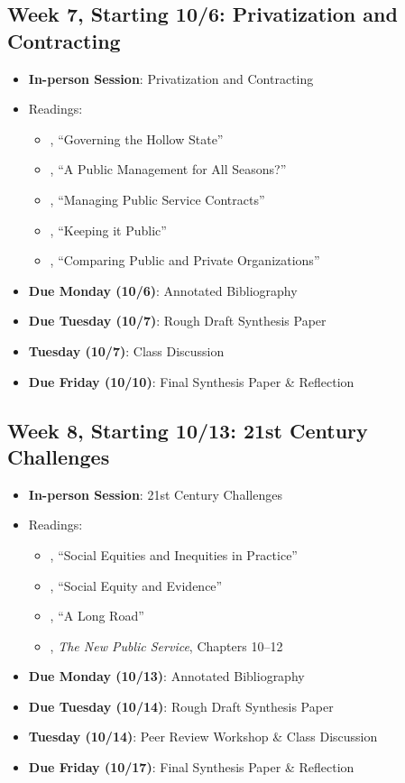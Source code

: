 \documentclass[12pt, letterpaper]{article}
\begin{document}
\subsection*{Week 7, Starting 10/6: Privatization and Contracting}
\begin{itemize}
    \item \textbf{In-person Session}: Privatization and Contracting
    \item Readings:
        \begin{itemize}
            \item \citet{MILWARD2000a}, ``Governing the Hollow State''
            \item \cite{hood1991}, ``A Public Management for All Seasons?''
            \item \citet{brownManagingPublicService2006}, ``Managing Public Service Contracts''
            \item \citet{jos2009}, ``Keeping it Public''
            \item \citet{RAINEY2000a}, ``Comparing Public and Private Organizations''
        \end{itemize}
    \item \textbf{Due Monday (10/6)}: Annotated Bibliography
    \item \textbf{Due Tuesday (10/7)}: Rough Draft Synthesis Paper
    \item \textbf{Tuesday (10/7)}: Class Discussion
    \item \textbf{Due Friday (10/10)}: Final Synthesis Paper \& Reflection
\end{itemize}

\subsection*{Week 8, Starting 10/13: 21st Century Challenges}
\begin{itemize}
    \item \textbf{In-person Session}: 21st Century Challenges
    \item Readings:
        \begin{itemize}
            \item \citet{maynard-moody2012}, ``Social Equities and Inequities in Practice'' 
            \item \citet{GOODEN2017}, ``Social Equity and Evidence'' 
            \item \citet{mccandless2022}, ``A Long Road''
            \item \citet{Denhardt2015}, \emph{The New Public Service}, Chapters 10--12 
        \end{itemize}
    \item \textbf{Due Monday (10/13)}: Annotated Bibliography
    \item \textbf{Due Tuesday (10/14)}: Rough Draft Synthesis Paper
    \item \textbf{Tuesday (10/14)}: Peer Review Workshop \& Class Discussion
    \item \textbf{Due Friday (10/17)}: Final Synthesis Paper \& Reflection
\end{itemize}
\end{document}
